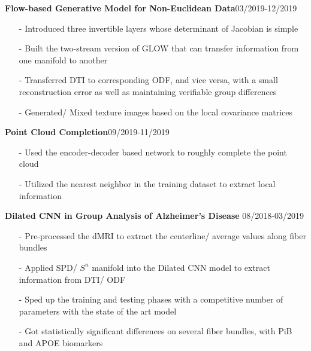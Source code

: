 \documentclass[margin]{res}
\begin{document}
\begin{resume}
                \textbf{Flow-based Generative Model for Non-Euclidean Data}\hfill 03/2019-12/2019
                \begin{itemize}\itemsep -2.2pt %
                 \item[-] Introduced three invertible layers whose determinant of Jacobian is simple
                 \item[-] Built the two-stream version of GLOW that can transfer information from one manifold to another
                 \item[-] Transferred DTI to corresponding ODF, and vice versa, with a small reconstruction error as well as maintaining verifiable group differences
                 \item[-] Generated/ Mixed texture images based on the local covariance matrices
                 \end{itemize}

                \textbf{Point Cloud Completion}\hfill 09/2019-11/2019
                \begin{itemize}\itemsep -2.2pt %
                 \item[-] Used the encoder-decoder based network to roughly complete the point cloud
                 \item[-] Utilized the nearest neighbor in the training dataset to extract local information
                 \end{itemize}

                \textbf{Dilated CNN in Group Analysis of Alzheimer's Disease} \hfill 08/2018-03/2019
                \begin{itemize}\itemsep -2.2pt %
                 \item[-] Pre-processed the dMRI to extract the centerline/ average values along fiber bundles
                 \item[-] Applied SPD/ $S^n$ manifold into the Dilated CNN model to extract information from DTI/ ODF
                 \item[-] Sped up the training and testing phases with a competitive number of parameters with the state of the art model
                 \item[-] Got statistically significant differences on several fiber bundles, with PiB and APOE biomarkers
                 \end{itemize}


\end{resume}
\end{document}
